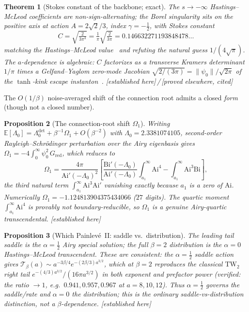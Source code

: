 \documentclass[11pt,reqno]{amsart}
\theoremstyle{plain}
\newtheorem{theorem}{Theorem}
\newtheorem{proposition}[theorem]{Proposition}
\theoremstyle{definition}
\theoremstyle{remark}
\newcommand{\E}{\mathbb{E}}
\newcommand{\Ai}{\mathrm{Ai}}
\newcommand{\Bi}{\mathrm{Bi}}
\newcommand{\TW}{\mathrm{TW}}
\newcommand{\tagPr}{{\footnotesize\textsf{[established here]}}}
\newcommand{\tagP}{{\footnotesize\textsf{[proved elsewhere, cited]}}}
\begin{document}
\begin{theorem}[Stokes constant of the backbone; exact]\label{thm:C}
The $s\to-\infty$ Hastings--McLeod coefficients are non-sign-alternating; the Borel singularity
sits on the positive axis at action $A=2\sqrt2/3$, index $\gamma=-\tfrac12$, with Stokes constant
\[
C=\sqrt{\tfrac{2}{3\pi^3}}=\tfrac1\pi\sqrt{\tfrac{2}{3\pi}}=0.146632271193848478\ldots
\]
matching the Hastings--McLeod value~\cite{CleriDunne,Dunne2025,KapaevHM} and refuting the natural
guess $1/(4\sqrt\pi)$. The $a$-dependence is algebraic: $C$ factorizes as a transverse Kramers
determinant $1/\pi$ times a Gelfand--Yaglom zero-mode Jacobian $\sqrt{2/(3\pi)}=\|\psi_0\|/\sqrt{2\pi}$
of the $\tanh$-kink escape instanton~\cite{SGG}. \tagPr\,/\,\tagP
\end{theorem}

The $O(1/\beta)$ noise-averaged shift of the connection root admits a closed \emph{form} (though
not a closed number).

\begin{proposition}[The connection-root shift $\Omega_1$]\label{prop:om1}
Writing $\E[\Lambda_0]=\Lambda_0^{\det}+\beta^{-1}\Omega_1+O(\beta^{-2})$ with
$\Lambda_0=2.3381074105$, second-order Rayleigh--Schr\"odinger perturbation over the Airy
eigenbasis gives $\Omega_1=-4\int_0^\infty\psi_0^2\,G_{\mathrm{red}}$, which reduces to
\[
\Omega_1=\frac{4\pi}{\Ai'(-\Lambda_0)^2}
\left[\frac{\Bi'(-\Lambda_0)}{\Ai'(-\Lambda_0)}\int_{a_1}^\infty\!\Ai^4
-\int_{a_1}^\infty\!\Ai^3\Bi\right],
\]
the third natural term $\int_{a_1}^\infty\Ai^3\Ai'$ vanishing exactly because $a_1$ is a zero of
$\Ai$. Numerically $\Omega_1=-1.124813904375434066$ ($27$ digits). The quartic moment
$\int_{a_1}^\infty\Ai^4$ is provably not boundary-reducible, so $\Omega_1$ is a genuine
Airy-quartic transcendental. \tagPr
\end{proposition}

\begin{proposition}[Which Painlev\'e~II: saddle vs.\ distribution]\label{prop:alpha}
The leading tail \emph{saddle} is the $\alpha=\tfrac12$ Airy special solution; the full $\beta{=}2$
\emph{distribution} is the $\alpha=0$ Hastings--McLeod transcendent. These are consistent: the
$\alpha=\tfrac12$ saddle action gives
$\mathcal T_\beta(a)\sim a^{-3\beta/4}e^{-(2\beta/3)a^{3/2}}$, which at $\beta{=}2$ reproduces the
classical $\TW_2$ right tail $e^{-(4/3)a^{3/2}}/(16\pi a^{3/2})$ in both exponent and prefactor
power (verified: the ratio $\to1$, e.g.\ $0.941,0.957,0.967$ at $a=8,10,12$). Thus $\alpha=\tfrac12$
governs the saddle/rate and $\alpha=0$ the distribution; this is the ordinary saddle-vs-distribution
distinction, not a $\beta$-dependence. \tagPr
\end{proposition}
\end{document}
